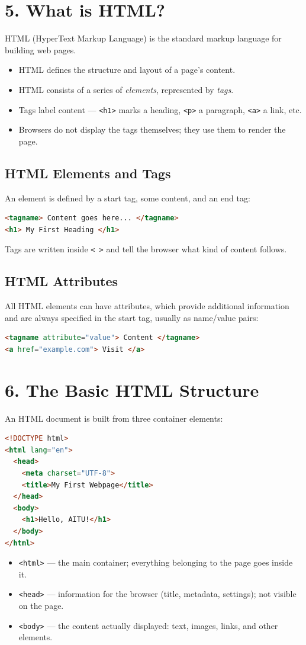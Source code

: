\documentclass[12pt]{article}
\begin{document}
\section{5. What is HTML?}
HTML (HyperText Markup Language) is the standard markup language for building web pages.
\begin{itemize}
    \item HTML defines the structure and layout of a page's content.
    \item HTML consists of a series of \emph{elements}, represented by \emph{tags}.
    \item Tags label content — \texttt{<h1>} marks a heading, \texttt{<p>} a paragraph, \texttt{<a>} a link, etc.
    \item Browsers do not display the tags themselves; they use them to render the page.
\end{itemize}

\subsection{HTML Elements and Tags}
An element is defined by a start tag, some content, and an end tag:
\begin{lstlisting}[language=HTML]
<tagname> Content goes here... </tagname>
<h1> My First Heading </h1>
\end{lstlisting}
Tags are written inside \texttt{< >} and tell the browser what kind of content follows.

\subsection{HTML Attributes}
All HTML elements can have attributes, which provide additional information and are always specified in the start tag, usually as name/value pairs:
\begin{lstlisting}[language=HTML]
<tagname attribute="value"> Content </tagname>
<a href="example.com"> Visit </a>
\end{lstlisting}

\section{6. The Basic HTML Structure}
An HTML document is built from three container elements:
\begin{lstlisting}[language=HTML]
<!DOCTYPE html>
<html lang="en">
  <head>
    <meta charset="UTF-8">
    <title>My First Webpage</title>
  </head>
  <body>
    <h1>Hello, AITU!</h1>
  </body>
</html>
\end{lstlisting}
\begin{itemize}
    \item \texttt{<html>} — the main container; everything belonging to the page goes inside it.
    \item \texttt{<head>} — information for the browser (title, metadata, settings); not visible on the page.
    \item \texttt{<body>} — the content actually displayed: text, images, links, and other elements.
\end{itemize}
\end{document}
